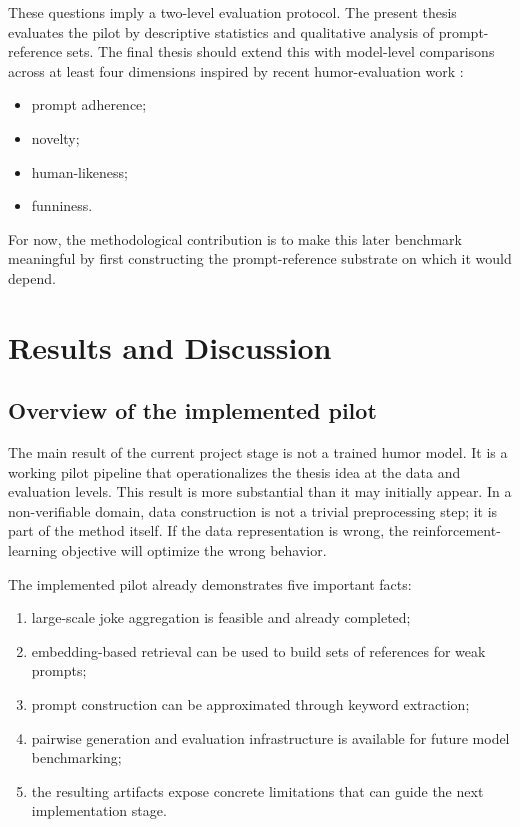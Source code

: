 \documentclass[14pt,a4paper]{extreport}
\begin{document}
These questions imply a two-level evaluation protocol. The present thesis evaluates the pilot by descriptive statistics and qualitative analysis of prompt-reference sets. The final thesis should extend this with model-level comparisons across at least four dimensions inspired by recent humor-evaluation work \citep{Sakabe2025,Hashemi2024,Gunjal2025}:
\begin{itemize}
  \item prompt adherence;
  \item novelty;
  \item human-likeness;
  \item funniness.
\end{itemize}

For now, the methodological contribution is to make this later benchmark meaningful by first constructing the prompt-reference substrate on which it would depend.

\chapter{Results and Discussion}

\section{Overview of the implemented pilot}

The main result of the current project stage is not a trained humor model. It is a working pilot pipeline that operationalizes the thesis idea at the data and evaluation levels. This result is more substantial than it may initially appear. In a non-verifiable domain, data construction is not a trivial preprocessing step; it is part of the method itself. If the data representation is wrong, the reinforcement-learning objective will optimize the wrong behavior.

The implemented pilot already demonstrates five important facts:
\begin{enumerate}
  \item large-scale joke aggregation is feasible and already completed;
  \item embedding-based retrieval can be used to build sets of references for weak prompts;
  \item prompt construction can be approximated through keyword extraction;
  \item pairwise generation and evaluation infrastructure is available for future model benchmarking;
  \item the resulting artifacts expose concrete limitations that can guide the next implementation stage.
\end{enumerate}
\end{document}

